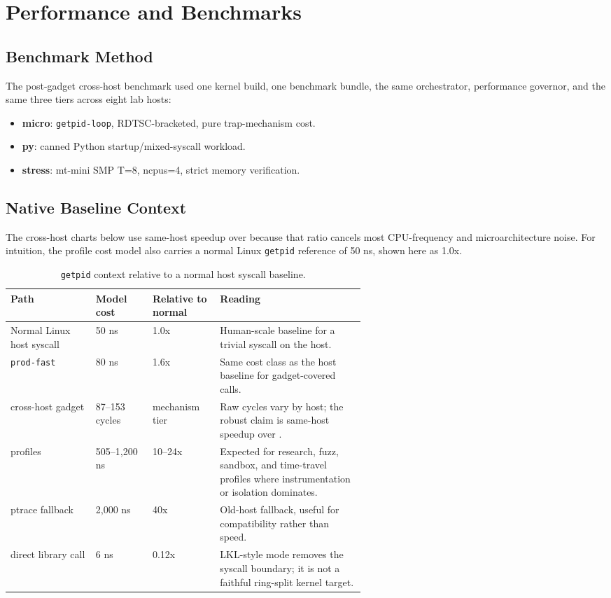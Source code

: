 \section{Performance and Benchmarks}

\subsection{Benchmark Method}

The post-gadget cross-host benchmark used one kernel build, one
benchmark bundle, the same orchestrator, performance governor, and the
same three tiers across eight lab hosts:
\begin{itemize}
  \item \textbf{micro}: \texttt{getpid-loop}, RDTSC-bracketed, pure
        trap-mechanism cost.
  \item \textbf{py}: canned Python startup/mixed-syscall workload.
  \item \textbf{stress}: mt-mini SMP T=8, ncpus=4, strict memory
        verification.
\end{itemize}

\subsection{Native Baseline Context}

The cross-host charts below use same-host speedup over \Seccomp{}
because that ratio cancels most CPU-frequency and microarchitecture
noise. For intuition, the profile cost model also carries a normal
Linux \texttt{getpid} reference of 50 ns, shown here as 1.0x.

\begin{table}[h]
\centering
\caption{\texttt{getpid} context relative to a normal host syscall baseline.}
\small
\begin{tabularx}{\linewidth}{@{}L{0.24\linewidth}L{0.16\linewidth}L{0.19\linewidth}Y@{}}
\toprule
Path & Model cost & Relative to normal & Reading \\
\midrule
Normal Linux host syscall & 50 ns & 1.0x & Human-scale baseline for a trivial syscall on the host. \\
\KVMvTwo{} \texttt{prod-fast} & 80 ns & 1.6x & Same cost class as the host baseline for gadget-covered calls. \\
\KVMvTwo{} cross-host gadget & 87--153 cycles & mechanism tier & Raw cycles vary by host; the robust claim is same-host speedup over \Seccomp{}. \\
\Seccomp{} profiles & 505--1,200 ns & 10--24x & Expected for research, fuzz, sandbox, and time-travel profiles where instrumentation or isolation dominates. \\
ptrace fallback & 2,000 ns & 40x & Old-host fallback, useful for compatibility rather than speed. \\
direct library call & 6 ns & 0.12x & LKL-style mode removes the syscall boundary; it is not a faithful ring-split kernel target. \\
\bottomrule
\end{tabularx}
\end{table}

